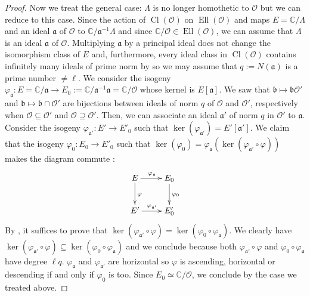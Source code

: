\documentclass[a4paper,10pt]{report}
\theoremstyle{definition}
\theoremstyle{plain}
\theoremstyle{definition}
\newcommand{\C}{\mathbb{C}}
\newcommand{\mO}{\mathcal{O}}
\renewcommand{\(}{\left(}
\renewcommand{\)}{\right)}
\newcommand{\mf}[1]{\mathfrak{#1}}
\DeclareMathOperator{\Cl}{Cl}
\DeclareMathOperator{\Ell}{Ell}
\begin{document}
\begin{proof}
Now we treat the general case: $\Lambda$ is no longer homothetic to $\mO$ but we can reduce to this case. Since the action of $\Cl(\mO)$ on $\Ell(\mO)$ and maps $E=\C/\Lambda$ and an ideal $\mf{a}$ of $\mO$ to $\C/\mf{a}^{-1}\Lambda$ and since $\C/\mO\in\Ell(\mO)$, we can assume that $\Lambda$ is an ideal $\mf{a}$ of $\mO$.  Multiplying $\mf{a}$ by a principal ideal does not change the isomorphism class of $E$ and, furthermore, every ideal class in $\Cl(\mO)$ contains infinitely many ideals of prime norm by \cite[theorems 7.7. (iii) and 9.12]{Cox} so we may assume that $q:=N(\mf{a})$ is a prime number $\neq\ell$.  We consider the isogeny $\varphi_{\mf{a}}:E=\C/\mf{a}\longrightarrow E_0:=\C/\mf{a}^{-1}\mf{a}=\C/\mO$ whose kernel is $E[\mf{a}]$. We saw that $\mf{b}\longmapsto\mf{b}\mO'$ and $\mf{b}\longmapsto\mf{b}\cap\mO'$ are bijections between ideals of norm $q$ of $\mO$ and $\mO'$, respectively when $\mO\subseteq\mO'$ and $\mO\supseteq\mO'$.  Then, we can associate an ideal $\mf{a}'$ of norm $q$ in $\mO'$ to $\mf{a}$. Consider the isogeny $\varphi_{\mf{a}'}:E'\longrightarrow E'_0$ such that $\ker(\varphi_{\mf{a}'})=E'[\mf{a}']$. We claim that the isogeny $\varphi_0 : E_0\longrightarrow E'_0$ such that $\ker(\varphi_0)=\varphi_{\mf{a}}(\ker(\varphi_{\mf{a}'}\circ\varphi))$ makes the diagram commute :
\[\xymatrix{
E \ar[d]^{\varphi} \ar[r]^{\varphi_{\mf{a}}} & E_0 \ar[d]^{\varphi_0} \\
E' \ar[r]^{\varphi_{\mf{a}'}} & E'_0
}\]
By \cite[corollary III.4.11]{Silverman1}, it suffices to prove that $\ker(\varphi_{\mf{a}'}\circ\varphi)=\ker(\varphi_0\circ \varphi_{\mf{a}})$. We clearly have $\ker(\varphi_{\mf{a}'}\circ\varphi)\subseteq \ker(\varphi_0\circ \varphi_{\mf{a}})$ and we conclude because both $\varphi_{\mf{a}'}\circ\varphi$ and $\varphi_0\circ \varphi_{\mf{a}}$ have degree $\ell q$.  $\varphi_{\mf{a}}$ and $\varphi_{\mf{a}'}$ are horizontal so $\varphi$ is ascending, horizontal or descending if and only if $\varphi_0$ is too. Since $E_0\simeq\C/\mO$, we conclude by the case we treated above.


\end{proof}
\end{document}
